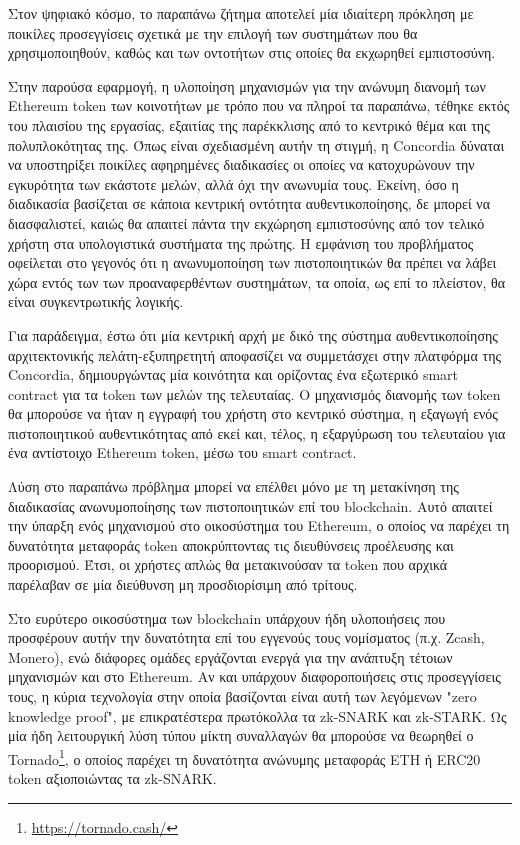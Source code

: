 Στον ψηφιακό κόσμο, το παραπάνω ζήτημα αποτελεί μία ιδιαίτερη πρόκληση με ποικίλες προσεγγίσεις σχετικά με την επιλογή των συστημάτων που θα χρησιμοποιηθούν, καθώς και των οντοτήτων στις οποίες θα εκχωρηθεί εμπιστοσύνη.

Στην παρούσα εφαρμογή, η υλοποίηση μηχανισμών για την ανώνυμη διανομή των Ethereum token των κοινοτήτων με τρόπο που να πληροί τα παραπάνω, τέθηκε εκτός του πλαισίου της εργασίας, εξαιτίας της παρέκκλισης από το κεντρικό θέμα και της πολυπλοκότητας της. Όπως είναι σχεδιασμένη αυτήν τη στιγμή, η Concordia δύναται να υποστηρίξει ποικίλες αφηρημένες διαδικασίες οι οποίες να κατοχυρώνουν την εγκυρότητα των εκάστοτε μελών, αλλά όχι την ανωνυμία τους. Εκείνη, όσο η διαδικασία βασίζεται σε κάποια κεντρική οντότητα αυθεντικοποίησης, δε μπορεί να διασφαλιστεί, καιώς θα απαιτεί πάντα την εκχώρηση εμπιστοσύνης από τον τελικό χρήστη στα υπολογιστικά συστήματα της πρώτης. Η εμφάνιση του προβλήματος οφείλεται στο γεγονός ότι η ανωνυμοποίηση των πιστοποιητικών θα πρέπει να λάβει χώρα εντός των των προαναφερθέντων συστημάτων, τα οποία, ως επί το πλείστον, θα είναι συγκεντρωτικής λογικής.

Για παράδειγμα, έστω ότι μία κεντρική αρχή με δικό της σύστημα αυθεντικοποίησης αρχιτεκτονικής πελάτη-εξυπηρετητή αποφασίζει να συμμετάσχει στην πλατφόρμα της Concordia, δημιουργώντας μία κοινότητα και ορίζοντας ένα εξωτερικό smart contract για τα token των μελών της τελευταίας. Ο μηχανισμός διανομής των token θα μπορούσε να ήταν η εγγραφή του χρήστη στο κεντρικό σύστημα, η εξαγωγή ενός πιστοποιητικού αυθεντικότητας από εκεί και, τέλος, η εξαργύρωση του τελευταίου για ένα αντίστοιχο Ethereum token, μέσω του smart contract.

Λύση στο παραπάνω πρόβλημα μπορεί να επέλθει μόνο με τη μετακίνηση της διαδικασίας ανωνυμοποίησης των πιστοποιητικών επί του blockchain. Αυτό απαιτεί την ύπαρξη ενός μηχανισμού στο οικοσύστημα του Ethereum, ο οποίος να παρέχει τη δυνατότητα μεταφοράς token αποκρύπτοντας τις διευθύνσεις προέλευσης και προορισμού. Έτσι, οι χρήστες απλώς θα μετακινούσαν τα token που αρχικά παρέλαβαν σε μία διεύθυνση μη προσδιορίσιμη από τρίτους.

Στο ευρύτερο οικοσύστημα των blockchain υπάρχουν ήδη υλοποιήσεις που προσφέρουν αυτήν την δυνατότητα επί του εγγενούς τους νομίσματος (π.χ. Zcash, Monero), ενώ διάφορες ομάδες εργάζονται ενεργά για την ανάπτυξη τέτοιων μηχανισμών και στο Ethereum. Αν και υπάρχουν διαφοροποιήσεις στις προσεγγίσεις τους, η κύρια τεχνολογία στην οποία βασίζονται είναι αυτή των λεγόμενων "zero knowledge proof", με επικρατέστερα πρωτόκολλα τα zk-SNARK και zk-STARK. Ως μία ήδη λειτουργική λύση τύπου μίκτη συναλλαγών θα μπορούσε να θεωρηθεί ο Tornado\footnote{\url{https://tornado.cash/}}, ο οποίος παρέχει τη δυνατότητα ανώνυμης μεταφοράς ETH ή ERC20 token αξιοποιώντας τα zk-SNARK.\cite{5.4-privacy-on-ethereum} 

